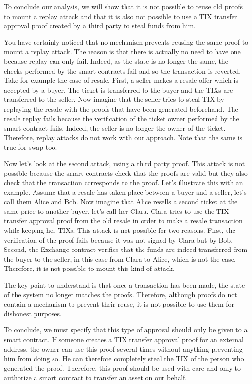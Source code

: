 \documentclass[a4paper,11pt,oneside]{report}
\begin{document}
To conclude our analysis, we will show that it is not possible to reuse old proofs to mount a replay attack and that it is also not possible to use a TIX transfer approval proof created by a third party to steal funds from him.

You have certainly noticed that no mechanism prevents reusing the same proof to mount a replay attack. The reason is that there is actually no need to have one because replay can only fail. Indeed, as the state is no longer the same, the checks performed by the smart contracts fail and so the transaction is reverted. Take for example the case of resale. First, a seller makes a resale offer which is accepted by a buyer. The ticket is transferred to the buyer and the TIXs are transferred to the seller. Now imagine that the seller tries to steal TIX by replaying the resale with the proofs that have been generated beforehand. The resale replay fails because the verification of the ticket owner performed by the smart contract fails. Indeed, the seller is no longer the owner of the ticket. Therefore, replay attacks do not work with our approach. Note that the same is true for swap too.

Now let's look at the second attack, using a third party proof. This attack is not possible because the smart contracts check that the proofs are valid but they also check that the transaction corresponds to the proof. Let's illustrate this with an example. Assume that a resale has taken place between a buyer and a seller, let's call them Alice and Bob. Now imagine that Alice resells a second ticket at the same price to another buyer, let's call her Clara. Clara tries to use the TIX transfer approval proof from the old resale in order to make a resale transaction while keeping her TIXs. This attack is not possible for two reasons. First, the verification of the proof fails because it was not signed by Clara but by Bob. Second, the Exchange contract verifies that the funds are indeed transferred from the buyer to the seller, in this case from Clara to Alice, which is not the case. Therefore, it is not possible to mount this kind of attack.

The key point to understand is that once a transaction has been made, the state of the system no longer matches the proofs. Therefore, although proofs do not contain a mechanism to prevent their reuse, it is not possible to use them for dishonest purposes.

To conclude, we must specify that this type of approval should only be given to a smart contract. If someone creates a TIX transfer approval proof for an external address, the owner can use this proof several times without anything preventing him from doing so. He can therefore completely steal the TIX of the person who generated the proof. Therefore, this proof should be used with care and only to authorize a smart contract to transfer an asset on our behalf.
\end{document}
